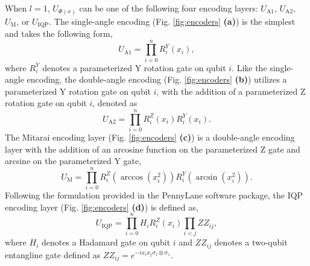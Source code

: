 \documentclass[journal=jacsat,manuscript=article]{achemso}
\begin{document}
When $l=1$, $U_{\Phi(x)}$ can be one of the following four encoding layers: $U_{\text{A1}}$, $U_{\text{A2}}$, $U_{\text{M}}$, or $U_{\text{IQP}}$.
The single-angle encoding (Fig. \ref{fig:encoders} \textbf{(a)}) is the simplest and takes the following form,
\begin{equation}
	U_{\text{A1}} = \prod_{i=0}^{n} R^{Y}_{i}(x_{i}),
	\label{eq:A1}
\end{equation}
where $R^{Y}_{i}$ denotes a parameterized Y rotation gate on qubit $i$.
Like the single-angle encoding, the double-angle encoding (Fig. \ref{fig:encoders} \textbf{(b)}) utilizes a parameterized Y rotation gate on qubit $i$, with the addition of a parameterized Z rotation gate on qubit $i$, denoted as
\begin{equation}
	U_{\text{A2}} = \prod_{i=0}^{n}  R^{Z}_{i}(x_{i}) R^{Y}_{i}(x_{i}).
	\label{eq:A2}
\end{equation}
The Mitarai encoding layer (Fig. \ref{fig:encoders} \textbf{(c)}) is a double-angle encoding layer with the addition of an arcosine function on the parameterized Z gate and arcsine on the parameterized Y gate,
\begin{equation}
	U_{\text{M}}  = \prod_{i=0}^{n} R^{Z}_{i}(\arccos (x_{i}^{2})) R^{Y}_{i}(\arcsin (x_{i}^{2})).
	\label{eq:M}
\end{equation}
Following the formulation provided in the PennyLane\cite{bergholm_pennylane_2022} software package, the IQP encoding layer (Fig. \ref{fig:encoders} \textbf{(d)}) is defined as,
\begin{equation}
	U_{\text{IQP}}  = \prod_{i=0}^{n} H_{i} R^{Z}_{i}(x_{i})  \prod_{i<j} ZZ_{ij},
	\label{eq:IQP}
\end{equation}
where $H_{i}$ denotes a Hadamard gate on qubit $i$ and $ZZ_{ij}$ denotes a two-qubit entangline gate defined as $ZZ_{ij} = e^{-i x_{i} x_{j} \sigma_{z} \otimes \sigma_{z}}$.

  
  
\end{document}
